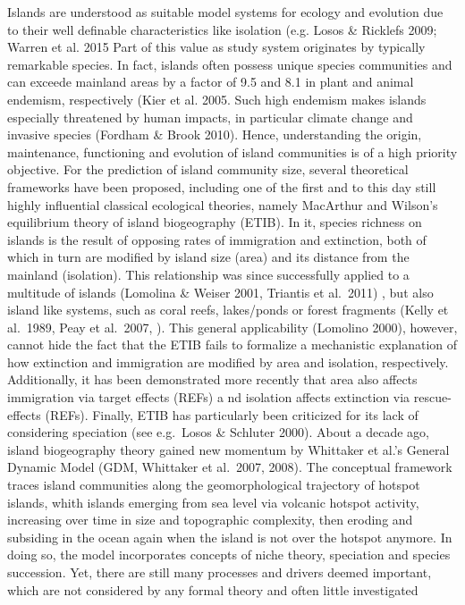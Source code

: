 \documentclass[a4paper]{scrartcl}
\begin{document}
Islands are understood as suitable model systems for ecology and evolution due to their well definable characteristics
like isolation (e.g. Losos \& Ricklefs 2009; Warren et al. 2015  %
Part of this value as study system originates by typically remarkable species.
In fact, islands often possess unique species communities and can exceede mainland areas
by a factor of 9.5 and 8.1 in plant and animal  endemism, respectively
(Kier et al. 2005. %
Such high endemism makes islands  especially threatened by human impacts, in particular climate change and invasive species (Fordham \& Brook 2010). %
Hence, understanding the origin, maintenance, functioning and evolution of island communities is of a high priority objective.
For the prediction of island community size, several theoretical frameworks have been proposed,
including one of the first and to this day still highly influential classical ecological theories,
namely MacArthur and Wilson's equilibrium theory of island biogeography (ETIB). %
In it, species richness on islands is the result of opposing rates of immigration and extinction,
both of which in turn are modified by island size (area) and its distance from the mainland (isolation).
This relationship was since successfully applied to a multitude of islands (Lomolina \& Weiser 2001, Triantis et al.\ 2011)%
, but also island like systems, such as coral reefs, lakes/ponds or forest fragments (Kelly et al.\ 1989, Peay et al.\ 2007, ). %
This general applicability (Lomolino 2000), however, cannot hide the fact
that the ETIB fails to formalize a mechanistic explanation of how extinction and immigration are modified by area and isolation, respectively.
Additionally, it has been demonstrated more recently that area also affects immigration via target effects (REFs) a
nd isolation affects extinction via rescue-effects (REFs).
Finally, ETIB has particularly been criticized for its lack of considering speciation (see e.g.\ Losos \& Schluter 2000). %
About a decade ago, island biogeography theory gained new momentum by Whittaker et al.'s General Dynamic Model (GDM, Whittaker et al.\ 2007, 2008). %
The conceptual framework traces island communities along the geomorphological trajectory of hotspot islands,
whith islands emerging from sea level via volcanic hotspot activity,
increasing over time in size and topographic complexity,
then eroding and subsiding in the ocean again when the island is not over the hotspot anymore.
In doing so, the model incorporates concepts of niche theory, speciation and species succession.
Yet, there are still many processes and drivers deemed important,
which are not considered by any formal theory and often little investigated
\end{document}
